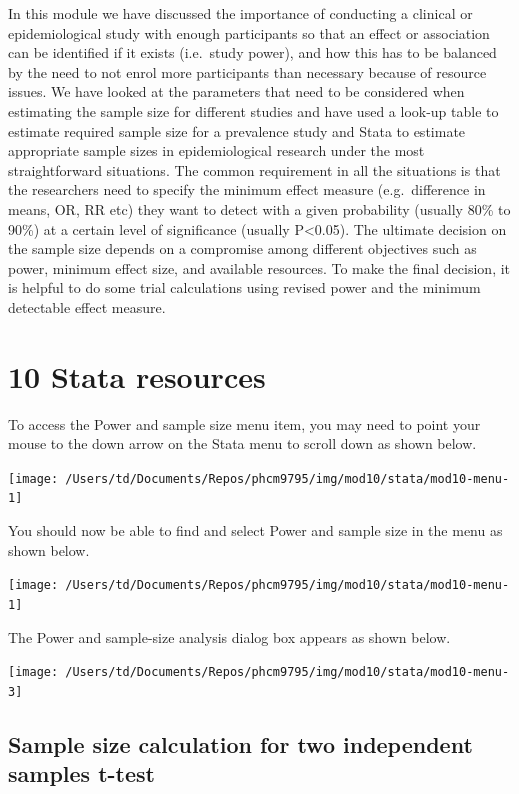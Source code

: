 \documentclass[
]{memoir}
\begin{document}
In this module we have discussed the importance of conducting a clinical or epidemiological study with enough participants so that an effect or association can be identified if it exists (i.e.~study power), and how this has to be balanced by the need to not enrol more participants than necessary because of resource issues. We have looked at the parameters that need to be considered when estimating the sample size for different studies and have used a look-up table to estimate required sample size for a prevalence study and Stata to estimate appropriate sample sizes in epidemiological research under the most straightforward situations. The common requirement in all the situations is that the researchers need to specify the minimum effect measure (e.g.~difference in means, OR, RR etc) they want to detect with a given probability (usually 80\% to 90\%) at a certain level of significance (usually P\textless0.05). The ultimate decision on the sample size depends on a compromise among different objectives such as power, minimum effect size, and available resources. To make the final decision, it is helpful to do some trial calculations using revised power and the minimum detectable effect measure.

\hypertarget{stata-resources-2}{%
\chapter*{\texorpdfstring{\textbf{10} Stata resources}{10 Stata resources}}\label{stata-resources-2}}

To access the Power and sample size menu item, you may need to point your mouse to the down arrow on the Stata menu to scroll down as shown below.

\texttt{[image: /Users/td/Documents/Repos/phcm9795/img/mod10/stata/mod10-menu-1]}

You should now be able to find and select Power and sample size in the menu as shown below.

\texttt{[image: /Users/td/Documents/Repos/phcm9795/img/mod10/stata/mod10-menu-1]}

The Power and sample-size analysis dialog box appears as shown below.

\texttt{[image: /Users/td/Documents/Repos/phcm9795/img/mod10/stata/mod10-menu-3]}

\hypertarget{sample-size-calculation-for-two-independent-samples-t-test}{%
\section{Sample size calculation for two independent samples t-test}\label{sample-size-calculation-for-two-independent-samples-t-test}}
\end{document}
